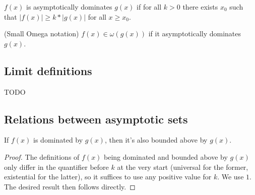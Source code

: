 \begin{definition}
    \label{def:asymp_dominates}
    \leanok
    $f(x)$ is asymptotically dominates $g(x)$ if for all $k > 0$ there exists $x_0$ 
    such that $|f(x)| \ge k*|g(x)|$ for all $x \ge x_0$.
\end{definition}

\begin{definition}(Small Omega notation)
    \label{def:small_omega}
    \leanok
    $f(x) \in \omega(g(x))$ if it asymptotically dominates $g(x)$.
\end{definition}


\subsection{Limit definitions}

TODO

\subsection{Relations between asymptotic sets}

\begin{theorem}
    \label{thm:asymp_dominated_implies_bounded_above}
    \leanok
    If $f(x)$ is dominated by $g(x)$, then it's also bounded above by $g(x)$.
\end{theorem}

\begin{proof}
    \leanok 
    The definitions of $f(x)$ being dominated and bounded above by $g(x)$ only differ
    in the quantifier before $k$ at the very start (universal for the former, existential
    for the latter), so it suffices to use any positive value for $k$. We use $1$. 
    The desired result then follows directly.
\end{proof}

